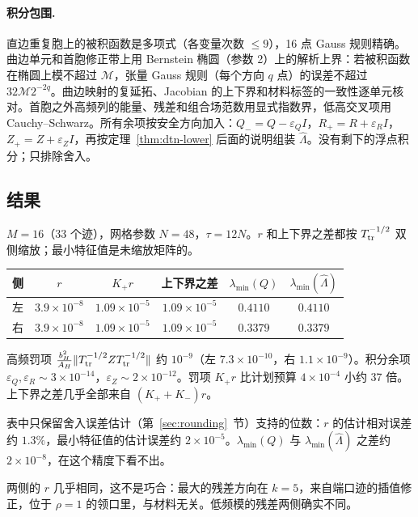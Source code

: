 \documentclass[11pt,a4paper,fontset=fandol]{ctexart}
\begin{document}
\paragraph{积分包围.} 直边重复胞上的被积函数是多项式（各变量次数 $\le9$），16 点 Gauss 规则精确。曲边单元和首胞修正带上用 Bernstein 椭圆（参数 2）上的解析上界：若被积函数在椭圆上模不超过 $\mathcal M$，张量 Gauss 规则（每个方向 $q$ 点）的误差不超过 $32\mathcal M2^{-2q}$。曲边映射的复延拓、Jacobian 的上下界和材料标签的一致性逐单元核对。首胞之外高频列的能量、残差和组合场范数用显式指数界，低高交叉项用 Cauchy--Schwarz。所有余项按安全方向加入：$Q_-=Q-\varepsilon_QI$，$R_+=R+\varepsilon_RI$，$Z_+=Z+\varepsilon_ZI$，再按定理~\ref{thm:dtn-lower} 后面的说明组装 $\hat\Lambda$。没有剩下的浮点积分；只排除舍入。

\subsection{结果}

$M=16$（33 个迹），网格参数 $N=48$，$\tau=12N$。$r$ 和上下界之差都按 $T_{\rm tr}^{-1/2}$ 双侧缩放；最小特征值是未缩放矩阵的。

\begin{center}
\small
\begin{tabular}{lccccc}
\toprule
侧 & $r$ & $K_+r$ & 上下界之差 & $\lambda_{\min}(Q)$ & $\lambda_{\min}(\hat\Lambda)$ \\
\midrule
左 & $3.9\times10^{-8}$ & $1.09\times10^{-5}$ & $1.09\times10^{-5}$ & $0.4110$ & $0.4110$ \\
右 & $3.9\times10^{-8}$ & $1.09\times10^{-5}$ & $1.09\times10^{-5}$ & $0.3379$ & $0.3379$ \\
\bottomrule
\end{tabular}
\end{center}

高频罚项 $\frac{b_H^2}{A_H}\|T_{\rm tr}^{-1/2}ZT_{\rm tr}^{-1/2}\|$ 约 $10^{-9}$（左 $7.3\times10^{-10}$，右 $1.1\times10^{-9}$）。积分余项 $\varepsilon_Q,\varepsilon_R\sim3\times10^{-14}$，$\varepsilon_Z\sim2\times10^{-12}$。罚项 $K_+r$ 比计划预算 $4\times10^{-4}$ 小约 37 倍。上下界之差几乎全部来自 $(K_++K_-)r$。

表中只保留舍入误差估计（第~\ref{sec:rounding}~节）支持的位数：$r$ 的估计相对误差约 $1.3\%$，最小特征值的估计误差约 $2\times10^{-5}$。$\lambda_{\min}(Q)$ 与 $\lambda_{\min}(\hat\Lambda)$ 之差约 $2\times10^{-8}$，在这个精度下看不出。

两侧的 $r$ 几乎相同，这不是巧合：最大的残差方向在 $k=5$，来自端口迹的插值修正，位于 $\rho=1$ 的领口里，与材料无关。低频模的残差两侧确实不同。
\end{document}
